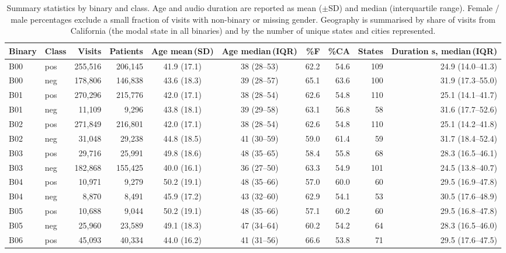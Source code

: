 \documentclass[utf8]{frontiers_suppmat} %
\begin{document}
\begin{table}[t]
\centering
\caption{Summary statistics by binary and class. Age and audio
duration are reported as mean ($\pm$SD) and median (interquartile
range). Female / male percentages exclude a small fraction of visits
with non-binary or missing gender. Geography is summarised by share
of visits from California (the modal state in all binaries) and by
the number of unique states and cities represented.}
\label{tab:supp-cohort-demographics}
\setlength{\tabcolsep}{3pt}
\renewcommand{\arraystretch}{1.05}
\footnotesize
\begin{tabular}{l l r r c c r r r r}
\toprule
Binary & Class & Visits & Patients & Age mean\,(SD) & Age median\,(IQR) & \%F & \%CA & States & Duration s, median\,(IQR) \\
\midrule
B00 & pos & 255{,}516 & 206{,}145 & 41.9 (17.1) & 38 (28--53) & 62.2 & 54.6 & 109 & 24.9 (14.0--41.3) \\
B00 & neg & 178{,}806 & 146{,}838 & 43.6 (18.3) & 39 (28--57) & 65.1 & 63.6 & 100 & 31.9 (17.3--55.0) \\
B01 & pos & 270{,}296 & 215{,}776 & 42.0 (17.1) & 38 (28--54) & 62.6 & 54.8 & 110 & 25.1 (14.1--41.7) \\
B01 & neg &  11{,}109 &   9{,}296 & 43.8 (18.1) & 39 (29--58) & 63.1 & 56.8 &  58 & 31.6 (17.7--52.6) \\
B02 & pos & 271{,}849 & 216{,}801 & 42.0 (17.1) & 38 (28--54) & 62.6 & 54.8 & 110 & 25.1 (14.2--41.8) \\
B02 & neg &  31{,}048 &  29{,}238 & 44.8 (18.5) & 41 (30--59) & 59.0 & 61.4 &  59 & 31.7 (18.4--52.4) \\
B03 & pos &  29{,}716 &  25{,}991 & 49.8 (18.6) & 48 (35--65) & 58.4 & 55.8 &  68 & 28.3 (16.5--46.1) \\
B03 & neg & 182{,}868 & 155{,}425 & 40.0 (16.1) & 36 (27--50) & 63.3 & 54.9 & 101 & 24.5 (13.8--40.7) \\
B04 & pos &  10{,}971 &   9{,}279 & 50.2 (19.1) & 48 (35--66) & 57.0 & 60.0 &  60 & 29.5 (16.9--47.8) \\
B04 & neg &   8{,}870 &   8{,}491 & 45.9 (17.2) & 43 (32--60) & 62.9 & 54.1 &  53 & 30.5 (17.6--48.9) \\
B05 & pos &  10{,}688 &   9{,}044 & 50.2 (19.1) & 48 (35--66) & 57.1 & 60.2 &  60 & 29.5 (16.8--47.8) \\
B05 & neg &  25{,}960 &  23{,}589 & 49.1 (18.3) & 47 (34--64) & 60.2 & 54.2 &  64 & 28.3 (16.5--46.0) \\
B06 & pos &  45{,}093 &  40{,}334 & 44.0 (16.2) & 41 (31--56) & 66.6 & 53.8 &  71 & 29.5 (17.6--47.5) \\

\end{tabular}
\end{table}
\end{document}
